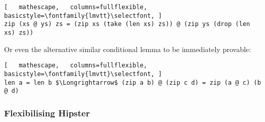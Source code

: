 \begin{lstlisting}[   mathescape,   columns=fullflexible,   basicstyle=\fontfamily{lmvtt}\selectfont, ]
zip (xs @ ys) zs = (zip xs (take (len xs) zs)) @ (zip ys (drop (len xs) zs))
\end{lstlisting}

\noindent Or even the alternative similar conditional lemma to be immediately provable:

\begin{lstlisting}[   mathescape,   columns=fullflexible,   basicstyle=\fontfamily{lmvtt}\selectfont, ]
len a = len b $\Longrightarrow$ (zip a b) @ (zip c d) = zip (a @ c) (b @ d)
\end{lstlisting}


\subsubsection*{Flexibilising Hipster}





